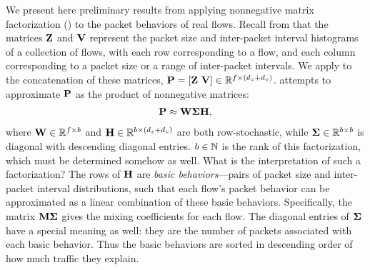 \documentclass[twocolumn,final]{svjour3}
\begin{document}
We present here preliminary results from applying nonnegative matrix factorization () to the packet behaviors of real flows. Recall from  that the matrices $\mathbf{Z}$ and $\mathbf{V}$ represent the packet size and inter-packet interval histograms of a collection of flows, with each row corresponding to a flow, and each column corresponding to a packet size or a range of inter-packet intervals. We apply  to the concatenation of these matrices, $\mathbf{P}=[\mathbf{Z}~\mathbf{V}] \in \mathbb{R}^{f \times (d_z+d_v)}$.  attempts to approximate $\mathbf{P}$ as the product of nonnegative matrices:
\begin{align}
\mathbf{P} \approx \mathbf{W}\mathbf{\Sigma}\mathbf{H},
\end{align}
where $\mathbf{W} \in \mathbb{R}^{f \times b}$ and $\mathbf{H} \in \mathbb{R}^{b \times (d_z+d_v)}$ are both row-stochastic, while
$\mathbf{\Sigma} \in \mathbb{R}^{b \times b}$ is diagonal with descending diagonal entries.
$b\in\mathbb{N}$ is the rank of this factorization, which must be determined somehow as well.
What is the interpretation of such a factorization?
The rows of $\mathbf{H}$ are \emph{basic behaviors}---pairs of packet size and inter-packet interval distributions, such that each flow's packet behavior can be approximated as a linear combination of these basic behaviors.
Specifically, the matrix $\mathbf{M}\mathbf{\Sigma}$ gives the mixing coefficients for each flow.
The diagonal entries of $\mathbf{\Sigma}$ have a special meaning as well:
they are the number of packets associated with each basic behavior.
Thus the basic behaviors are sorted in descending order of how much traffic they explain.
\end{document}
